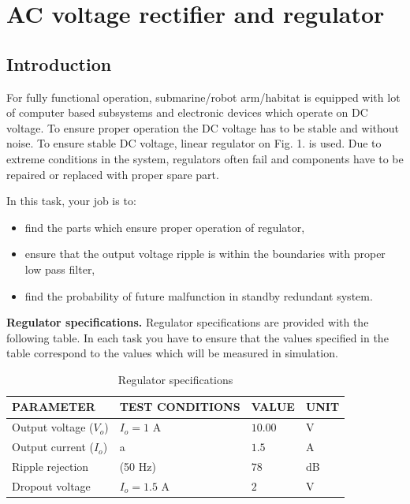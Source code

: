 \documentclass[a4paper]{article}
\begin{document}
\section{AC voltage rectifier and regulator}

\subsection{Introduction}

For fully functional operation, submarine/robot arm/habitat is equipped with 
lot of computer based subsystems and electronic devices which operate on DC 
voltage. To ensure proper operation the DC voltage has to be stable and without 
noise. To ensure stable DC voltage, linear regulator on Fig. 1. is used. Due to 
extreme conditions in the system, regulators often fail and components have to 
be repaired or replaced with proper spare part.

In this task, your job is to:
\begin{itemize}
\item find the parts which ensure proper operation of regulator, 
\item ensure that the output voltage ripple is within the boundaries with 
proper low pass filter,
\item find the probability of future malfunction in standby redundant system.
\end{itemize}

\textbf{Regulator specifications.} Regulator specifications are provided with 
the following table. In each task you have to ensure that the values specified
in the table correspond to the values which will be measured in simulation. 

\begin{table}[h!]
    \caption{Regulator specifications}
    \label{tab:spec}
    \begin{tabularx}{\linewidth}{|X|X|X|X|} \hline
    PARAMETER & TEST CONDITIONS & VALUE & UNIT \\ \hline 
    Output voltage ($V_o$)& $I_o = 1$ A & $10.00$ & V \\ \hline
    Output current ($I_o$) & a & $1.5$ & A \\ \hline
    Ripple rejection & (50 Hz) & $78$ & dB \\ \hline
   	Dropout voltage & $I_o = 1.5$ A & $2$ & V \\ \hline
    \end{tabularx}
\end{table}
\end{document}
